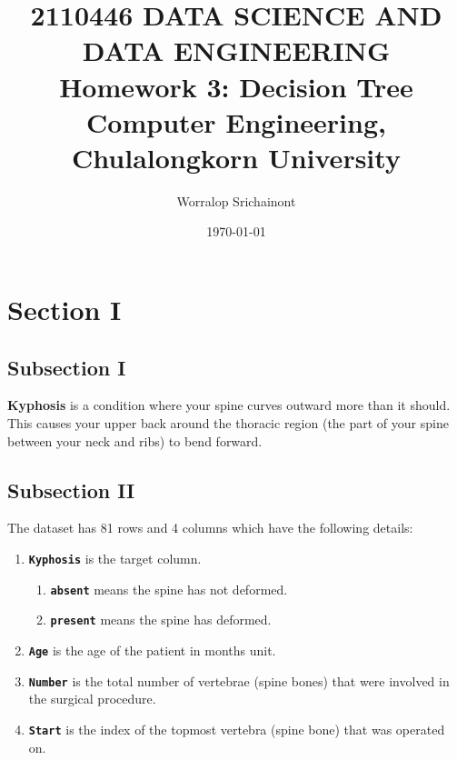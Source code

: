 \documentclass[12pt, a4paper]{article}
\title {
	\textbf{2110446 DATA SCIENCE AND DATA ENGINEERING} \\
    \vspace{1em}
	\Large{\textbf{Homework 3: Decision Tree}} \\
    \vspace{0.5em}
    \large{Computer Engineering, Chulalongkorn University}
}
\author{Worralop Srichainont}
\date{\today}
\begin{document}
    \maketitle
    \thispagestyle{empty}
    \clearpage

    \tableofcontents
    \thispagestyle{empty}
    \clearpage


    \section{Section I}
        \subsection{Subsection I}
            \textbf{Kyphosis} is a condition where your spine curves outward more than it should. This causes your upper back around the thoracic region (the part of your spine between your neck and ribs) to bend forward.
        
        \subsection{Subsection II}
            The dataset has 81 rows and 4 columns which have the following details:
            \begin{enumerate}
                \item \textbf{\texttt{Kyphosis}} is the target column.
                \begin{enumerate}
                    \item \textbf{\texttt{absent}} means the spine has not deformed.
                    \item \textbf{\texttt{present}} means the spine has deformed.
                \end{enumerate}

                \item \textbf{\texttt{Age}} is the age of the patient in months unit.
                \item \textbf{\texttt{Number}} is the total number of vertebrae (spine bones) that were involved in the surgical procedure.
                \item \textbf{\texttt{Start}} is the index of the topmost vertebra (spine bone) that was operated on.
            \end{enumerate}

    \pagebreak
\end{document}

